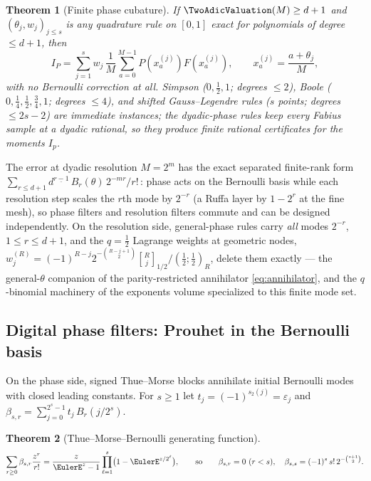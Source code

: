 \documentclass[11pt,oneside]{article}
\numberwithin{equation}{section}
\newtheorem{theorem}{Theorem}[section]
\theoremstyle{definition}
\theoremstyle{remark}
\newcommand{\eps}{\varepsilon}
\newcommand{\fall}[2]{#1^{\underline{#2}}}
\begin{document}
\begin{theorem}[Finite phase cubature]
\label{thm:phase-cubature}
If $\TwoAdicValuation(M)\ge d+1$ and $(\theta_j,w_j)_{j\le s}$ is any quadrature
rule on $[0,1]$ exact for polynomials of degree $\le d+1$, then
\begin{equation}
 \boxed{\;
 I_P=\sum_{j=1}^{s}w_j\,
 \frac1M\sum_{a=0}^{M-1}P(x_a^{(j)})F(x_a^{(j)}),
 \qquad x_a^{(j)}=\frac{a+\theta_j}{M},\;}
 \label{eq:phase-cubature}
\end{equation}
with \emph{no Bernoulli correction at all}.  Simpson
($0,\tfrac12,1$; degrees $\le2$), Boole
($0,\tfrac14,\tfrac12,\tfrac34,1$; degrees $\le4$), and shifted
Gauss--Legendre rules ($s$ points; degrees $\le2s-2$) are immediate
instances; the dyadic-phase rules keep every Fabius sample at a
dyadic rational, so they produce finite \emph{rational certificates}
for the moments $I_p$.
\end{theorem}

The error at dyadic resolution $M=2^{m}$ has the exact separated
finite-rank form
$\sum_{r\le d+1}\fall d{r-1}\,B_r(\theta)\,2^{-mr}/r!$\,: phase
acts on the Bernoulli basis while each resolution step scales the
$r$th mode by $2^{-r}$ (a Ruffa layer by $1-2^{r}$ at the fine mesh),
so phase filters and resolution filters commute and can be designed
independently.  On the resolution side, general-phase rules carry
\emph{all} modes $2^{-r}$, $1\le r\le d+1$, and the $q=\tfrac12$
Lagrange weights at geometric nodes,
$w_j^{(R)}=(-1)^{R-j}2^{-\binom{R-j+1}2}
\genfrac{[}{]}{0pt}{}{R}{j}_{1/2}/(\tfrac12;\tfrac12)_R$, delete them
exactly --- the general-$\theta$ companion of the parity-restricted
annihilator \eqref{eq:annihilator}, and the $q$-binomial machinery of
the exponents volume specialized to this finite mode set.

\subsection{Digital phase filters: Prouhet in the Bernoulli basis}

On the phase side, signed Thue--Morse blocks annihilate initial
Bernoulli modes with closed leading constants.  For $s\ge1$ let
$t_j=(-1)^{s_2(j)}=\eps_j$ and
$\beta_{s,r}=\sum_{j=0}^{2^{s}-1}t_j\,B_r(j/2^{s})$.

\begin{theorem}[Thue--Morse--Bernoulli generating function]
\label{thm:tm-bernoulli-egf}
\begin{equation}
 \sum_{r\ge0}\beta_{s,r}\frac{z^{r}}{r!}
 =\frac{z}{\EulerE^{z}-1}\prod_{\ell=1}^{s}
 \bigl(1-\EulerE^{z/2^{\ell}}\bigr),
 \qquad\text{so}\qquad
 \beta_{s,r}=0\ (r<s),
 \quad
 \beta_{s,s}=(-1)^{s}\,s!\,2^{-\binom{s+1}2}.
 \label{eq:tm-bernoulli-egf}
\end{equation}
\end{theorem}
\end{document}
